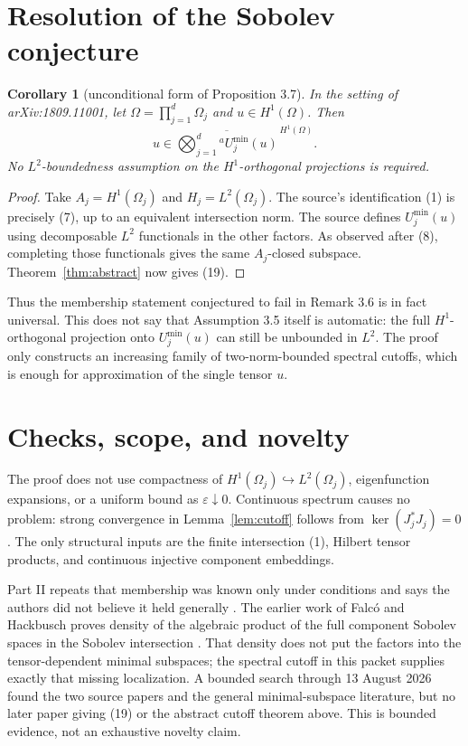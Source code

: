 \documentclass[11pt]{article}
\newtheorem{corollary}[theorem]{Corollary}
\newcommand{\clos}[1]{\overline{#1}}
\begin{document}
\section{Resolution of the Sobolev conjecture}

\begin{corollary}[unconditional form of Proposition 3.7]\label{cor:sob}
In the setting of arXiv:1809.11001, let
$\Omega=\prod_{j=1}^d\Omega_j$ and $u\in H^1(\Omega)$.  Then
\[
 u\in\clos{\bigotimes_{j=1}^d{}^aU_j^{\min}(u)}^{\,H^1(\Omega)}.
 \tag{19}
\]
No $L^2$-boundedness assumption on the $H^1$-orthogonal projections is
required.
\end{corollary}

\begin{proof}
Take $A_j=H^1(\Omega_j)$ and $H_j=L^2(\Omega_j)$.  The source's
identification (1) is precisely (7), up to an equivalent intersection norm.
The source defines $U_j^{\min}(u)$ using decomposable $L^2$ functionals in
the other factors.  As observed after (8), completing those functionals gives
the same $A_j$-closed subspace.  Theorem~\ref{thm:abstract} now gives (19).
\end{proof}

Thus the membership statement conjectured to fail in Remark 3.6 is in fact
universal.  This does not say that Assumption 3.5 itself is automatic: the
full $H^1$-orthogonal projection onto $U_j^{\min}(u)$ can still be unbounded
in $L^2$.  The proof only constructs an increasing family of two-norm-bounded
spectral cutoffs, which is enough for approximation of the single tensor $u$.

\section{Checks, scope, and novelty}

The proof does not use compactness of $H^1(\Omega_j)\hookrightarrow
L^2(\Omega_j)$, eigenfunction expansions, or a uniform bound as
$\varepsilon\downarrow0$.  Continuous spectrum causes no problem: strong
convergence in Lemma~\ref{lem:cutoff} follows from $\ker(J_j^*J_j)=0$.
The only structural inputs are the finite intersection (1), Hilbert tensor
products, and continuous injective component embeddings.

Part II repeats that membership was known only under conditions and says the
authors did not believe it held generally \cite{AN2}.  The earlier work of
Falc\'o and Hackbusch proves density of the algebraic product of the full
component Sobolev spaces in the Sobolev intersection \cite{FH}.  That density
does not put the factors into the tensor-dependent minimal subspaces; the
spectral cutoff in this packet supplies exactly that missing localization.
A bounded search through 13 August 2026 found the two source papers and the
general minimal-subspace literature, but no later paper giving (19) or the
abstract cutoff theorem above.  This is bounded evidence, not an exhaustive
novelty claim.
\end{document}
